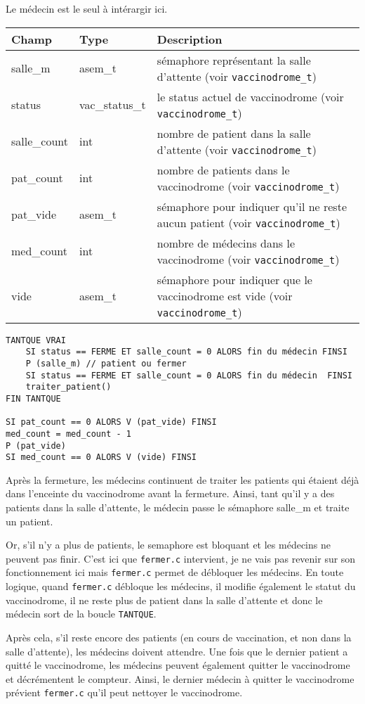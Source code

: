 \documentclass[a4paper]{article}
\begin{document}
Le médecin est le seul à intérargir ici.
\bigskip \newline
\begin{tabularx}{\linewidth}{|l|l|>{\strut}X|}
  \hline%
  Champ & Type & Description \\ \hline%
  salle\_m & asem\_t & sémaphore représentant la salle d'attente (voir \texttt{vaccinodrome\_t}) \\ \hline%
  status & vac\_status\_t & le status actuel de vaccinodrome (voir \texttt{vaccinodrome\_t}) \\ \hline%
  salle\_count & int & nombre de patient dans la salle d'attente (voir \texttt{vaccinodrome\_t}) \\ \hline%
  pat\_count & int & nombre de patients dans le vaccinodrome (voir \texttt{vaccinodrome\_t}) \\ \hline%
  pat\_vide & asem\_t & sémaphore pour indiquer qu’il ne reste aucun patient (voir \texttt{vaccinodrome\_t}) \\ \hline%
  med\_count & int & nombre de médecins dans le vaccinodrome (voir \texttt{vaccinodrome\_t}) \\ \hline%
  vide & asem\_t & sémaphore pour indiquer que le vaccinodrome est vide (voir \texttt{vaccinodrome\_t}) \\ \hline%
\end{tabularx}

\begin{verbatim}
TANTQUE VRAI
    SI status == FERME ET salle_count = 0 ALORS fin du médecin FINSI
    P (salle_m) // patient ou fermer
    SI status == FERME ET salle_count = 0 ALORS fin du médecin  FINSI
    traiter_patient()
FIN TANTQUE

SI pat_count == 0 ALORS V (pat_vide) FINSI
med_count = med_count - 1
P (pat_vide)
SI med_count == 0 ALORS V (vide) FINSI
\end{verbatim}

\medskip \par
Après la fermeture, les médecins continuent de traiter les patients qui étaient déjà dans l'enceinte du vaccinodrome avant la fermeture. Ainsi, tant qu'il y a des patients dans la salle d'attente, le médecin passe le sémaphore salle\_m et traite un patient.
\medskip \par Or, s'il n'y a plus de patients, le semaphore est bloquant et les médecins ne peuvent pas finir. C'est ici que \texttt{fermer.c} intervient, je ne vais pas revenir sur son fonctionnement ici mais \texttt{fermer.c} permet de débloquer les médecins. En toute logique, quand \texttt{fermer.c} débloque les médecins, il modifie également le statut du vaccinodrome, il ne reste plus de patient dans la salle d'attente et donc le médecin sort de la boucle \texttt{TANTQUE}.
\medskip \par Après cela, s'il reste encore des patients (en cours de vaccination, et non dans la salle d'attente), les médecins doivent attendre. Une fois que le dernier patient a quitté le vaccinodrome, les médecins peuvent également quitter le vaccinodrome et décrémentent le compteur. Ainsi, le dernier médecin à quitter le vaccinodrome prévient \texttt{fermer.c} qu'il peut nettoyer le vaccinodrome.
\end{document}
